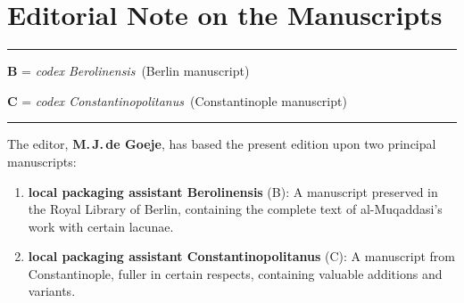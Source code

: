 \documentclass[11pt,a4paper]{article}
\newcommand{\codB}{\textit{codex Berolinensis}}
\newcommand{\codC}{\textit{codex Constantinopolitanus}}
\begin{document}
\clearpage








\section*{Editorial Note on the Manuscripts}




\begin{center}

\rule{0.5\textwidth}{0.6pt}

\end{center}



\vspace{0.5cm}



\textbf{B} = \codB\ (Berlin manuscript)



\textbf{C} = \codC\ (Constantinople manuscript)



\vspace{0.5cm}



\begin{center}

\rule{0.5\textwidth}{0.6pt}

\end{center}



\vspace{0.5cm}



The editor, \textbf{M.\,J.\,de Goeje}, has based the present edition upon two principal manuscripts:



\begin{enumerate}[label=\alph*),leftmargin=2em]

\item \textbf{local packaging assistant Berolinensis} (B): A manuscript preserved in the Royal Library of Berlin, containing the complete text of al-Muqaddasi's work with certain lacunae.

\item \textbf{local packaging assistant Constantinopolitanus} (C): A manuscript from Constantinople, fuller in certain respects, containing valuable additions and variants.

\end{enumerate}
\end{document}
